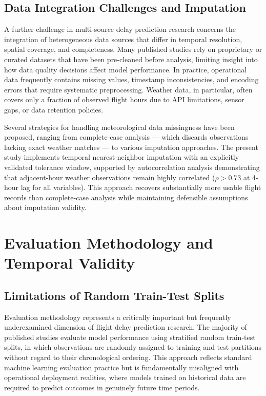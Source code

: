 \documentclass{report}
\begin{document}
\subsection{Data Integration Challenges and Imputation}

A further challenge in multi-source delay prediction research concerns the integration of heterogeneous data sources that differ in temporal resolution, spatial coverage, and completeness. Many published studies rely on proprietary or curated datasets that have been pre-cleaned before analysis, limiting insight into how data quality decisions affect model performance. In practice, operational data frequently contains missing values, timestamp inconsistencies, and encoding errors that require systematic preprocessing. Weather data, in particular, often covers only a fraction of observed flight hours due to API limitations, sensor gaps, or data retention policies.

Several strategies for handling meteorological data missingness have been proposed, ranging from complete-case analysis --- which discards observations lacking exact weather matches --- to various imputation approaches. The present study implements temporal nearest-neighbor imputation with an explicitly validated tolerance window, supported by autocorrelation analysis demonstrating that adjacent-hour weather observations remain highly correlated ($\rho > 0.73$ at 4-hour lag for all variables). This approach recovers substantially more usable flight records than complete-case analysis while maintaining defensible assumptions about imputation validity.

\section{Evaluation Methodology and Temporal Validity}

\subsection{Limitations of Random Train-Test Splits}

Evaluation methodology represents a critically important but frequently underexamined dimension of flight delay prediction research. The majority of published studies evaluate model performance using stratified random train-test splits, in which observations are randomly assigned to training and test partitions without regard to their chronological ordering. This approach reflects standard machine learning evaluation practice but is fundamentally misaligned with operational deployment realities, where models trained on historical data are required to predict outcomes in genuinely future time periods.
\end{document}
